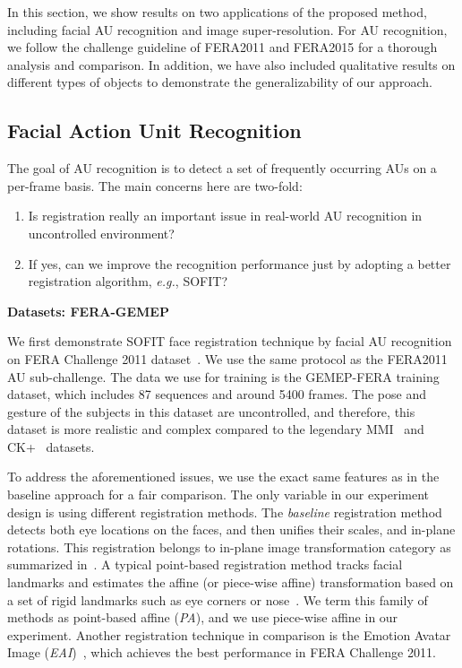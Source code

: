 \documentclass[10pt,journal]{IEEEtran}
\begin{document}
In this section, we show results on two applications of the proposed method, including facial AU recognition and image super-resolution. For AU recognition, we follow the challenge guideline of FERA2011 and FERA2015 for a thorough analysis and comparison. In addition, we have also included qualitative results on different types of objects to demonstrate the generalizability of our approach.

\subsection{Facial Action Unit Recognition}

The goal of AU recognition is to detect a set of frequently occurring AUs on a per-frame basis. The main concerns here are two-fold:
\begin{enumerate}
\item Is registration really an important issue in real-world AU recognition in uncontrolled environment?
\item If yes, can we improve the recognition performance just by adopting a better registration algorithm, \textit{e.g.}, SOFIT?
\end{enumerate}

\noindent \textbf{Datasets: FERA-GEMEP}

We first demonstrate SOFIT face registration technique by facial AU recognition on FERA Challenge 2011 dataset~\cite{FERA11}. We use the same protocol as the FERA2011~\cite{Valstar_FERA11} AU sub-challenge. The data we use for training is the GEMEP-FERA training dataset, which includes 87 sequences and around 5400 frames. The pose and gesture of the subjects in this dataset are uncontrolled, and therefore, this dataset is more realistic and complex compared to the legendary MMI~\cite{Pantic_ICME05} and CK+~\cite{Kanade_FG00} datasets.

To address the aforementioned issues, we use the exact same features as in the baseline approach for a fair comparison. The only variable in our experiment design is using different registration methods. The \textit{baseline} registration method detects both eye locations on the faces, and then unifies their scales, and in-plane rotations. This registration belongs to in-plane image transformation category as summarized in~\cite{Yang_SMCB12}. A typical point-based registration method tracks facial landmarks and estimates the affine (or piece-wise affine) transformation based on a set of rigid landmarks such as eye corners or nose~\cite{Littlewort_CERT_FG2011,IntraFace,McDuff_TAC14}. We term this family of methods as point-based affine (\textit{PA}), and we use piece-wise affine in our experiment. Another registration technique in comparison is the Emotion Avatar Image (\textit{EAI})~\cite{Yang_SMCB12}, which achieves the best performance in FERA Challenge 2011.
\end{document}
